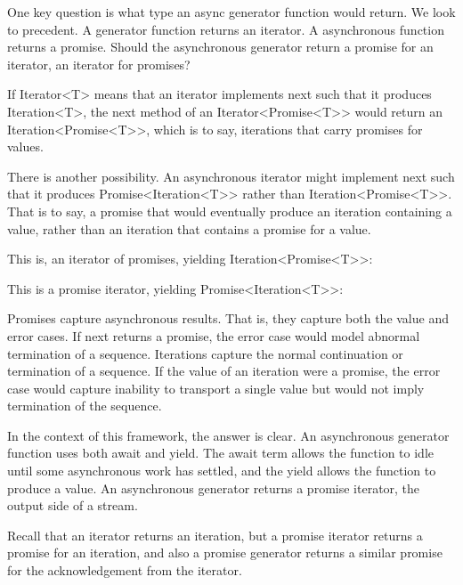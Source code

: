 One key question is what type an async generator function would return. We look to precedent. A generator function returns an iterator. A asynchronous function returns a promise. Should the asynchronous generator return a promise for an iterator, an iterator for promises?

If Iterator<T> means that an iterator implements next such that it produces Iteration<T>, the next method of an Iterator<Promise<T>> would return an Iteration<Promise<T>>, which is to say, iterations that carry promises for values.

There is another possibility. An asynchronous iterator might implement next such that it produces Promise<Iteration<T>> rather than Iteration<Promise<T>>. That is to say, a promise that would eventually produce an iteration containing a value, rather than an iteration that contains a promise for a value.

This is, an iterator of promises, yielding Iteration<Promise<T>>:

This is a promise iterator, yielding Promise<Iteration<T>>:

Promises capture asynchronous results. That is, they capture both the value and error cases. If next returns a promise, the error case would model abnormal termination of a sequence. Iterations capture the normal continuation or termination of a sequence. If the value of an iteration were a promise, the error case would capture inability to transport a single value but would not imply termination of the sequence.

In the context of this framework, the answer is clear. An asynchronous generator function uses both await and yield. The await term allows the function to idle until some asynchronous work has settled, and the yield allows the function to produce a value. An asynchronous generator returns a promise iterator, the output side of a stream.

Recall that an iterator returns an iteration, but a promise iterator returns a promise for an iteration, and also a promise generator returns a similar promise for the acknowledgement from the iterator.


